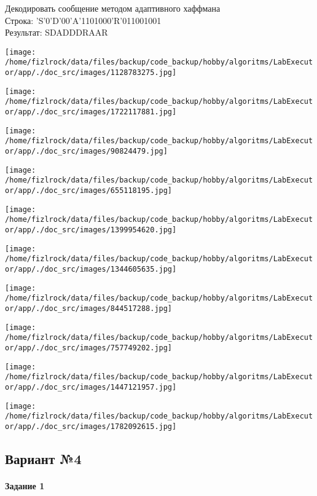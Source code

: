 \documentclass[a4paper, 12pt]{article}
\begin{document}
Декодировать сообщение методом адаптивного хаффмана \\
Строка: 
'S'0'D'00'A'1101000'R'011001001\\
Результат: SDADDDRAAR

\texttt{[image: /home/fizlrock/data/files/backup/code\_backup/hobby/algoritms/LabExecutor/app/./doc\_src/images/1128783275.jpg]}

\texttt{[image: /home/fizlrock/data/files/backup/code\_backup/hobby/algoritms/LabExecutor/app/./doc\_src/images/1722117881.jpg]}

\texttt{[image: /home/fizlrock/data/files/backup/code\_backup/hobby/algoritms/LabExecutor/app/./doc\_src/images/90824479.jpg]}

\texttt{[image: /home/fizlrock/data/files/backup/code\_backup/hobby/algoritms/LabExecutor/app/./doc\_src/images/655118195.jpg]}

\texttt{[image: /home/fizlrock/data/files/backup/code\_backup/hobby/algoritms/LabExecutor/app/./doc\_src/images/1399954620.jpg]}

\texttt{[image: /home/fizlrock/data/files/backup/code\_backup/hobby/algoritms/LabExecutor/app/./doc\_src/images/1344605635.jpg]}

\texttt{[image: /home/fizlrock/data/files/backup/code\_backup/hobby/algoritms/LabExecutor/app/./doc\_src/images/844517288.jpg]}

\texttt{[image: /home/fizlrock/data/files/backup/code\_backup/hobby/algoritms/LabExecutor/app/./doc\_src/images/757749202.jpg]}

\texttt{[image: /home/fizlrock/data/files/backup/code\_backup/hobby/algoritms/LabExecutor/app/./doc\_src/images/1447121957.jpg]}

\texttt{[image: /home/fizlrock/data/files/backup/code\_backup/hobby/algoritms/LabExecutor/app/./doc\_src/images/1782092615.jpg]}
\pagebreak
\subsection{Вариант №4}
\paragraph{Задание 1}
\end{document}
